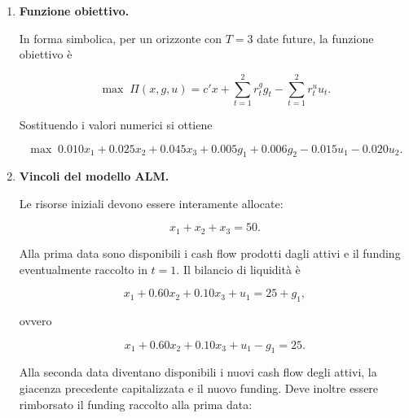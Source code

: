 \begin{enumerate}
I rendimenti delle giacenze sono

\[
r_1^{g}=0.005,
\qquad
r_2^{g}=0.006,
\]

mentre i costi del funding sono

\[
r_1^{u}=0.015,
\qquad
r_2^{u}=0.020.
\]

La capacit\`a massima di funding \`e

\[
\bar u_1=4,
\qquad
\bar u_2=3.
\]

Il vettore delle perdite unitarie nello scenario di stress \`e

\[
\ell
=
\begin{pmatrix}
0\\
0.03\\
0.08
\end{pmatrix},
\]

con limite complessivo

\[
K=2.6.
\]

Infine, il limite di concentrazione sui prestiti \`e

\[
x_3\leq25.
\]


\item \textbf{Funzione obiettivo.}

In forma simbolica, per un orizzonte con $T=3$ date future, la funzione
obiettivo \`e

\[
\max\;
\Pi(x,g,u)
=
c'x
+
\sum_{t=1}^{2}r^g_tg_t
-
\sum_{t=1}^{2}r^u_tu_t.
\]

Sostituendo i valori numerici si ottiene

\[
\boxed{
\max\;
0.010x_1
+
0.025x_2
+
0.045x_3
+
0.005g_1
+
0.006g_2
-
0.015u_1
-
0.020u_2.
}
\]


\item \textbf{Vincoli del modello ALM.}

Le risorse iniziali devono essere interamente allocate:

\[
x_1+x_2+x_3=50.
\]

Alla prima data sono disponibili i cash flow prodotti dagli attivi e il
funding eventualmente raccolto in $t=1$. Il bilancio di liquidit\`a \`e

\[
x_1
+
0.60x_2
+
0.10x_3
+
u_1
=
25+g_1,
\]

ovvero

\[
x_1
+
0.60x_2
+
0.10x_3
+
u_1
-
g_1
=
25.
\]

Alla seconda data diventano disponibili i nuovi cash flow degli attivi, la
giacenza precedente capitalizzata e il nuovo funding. Deve inoltre essere
rimborsato il funding raccolto alla prima data:


\end{enumerate}
